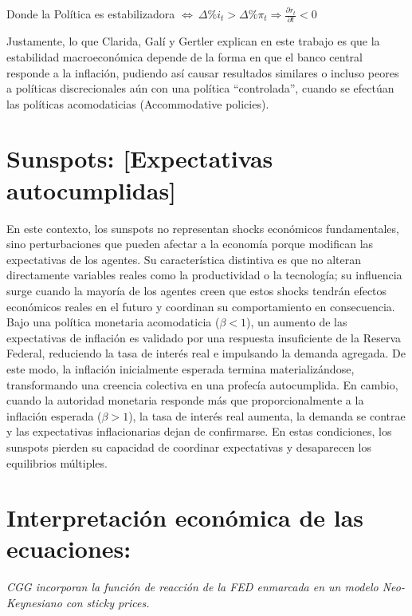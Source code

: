 \documentclass[12pt]{article}
\begin{document}
\vspace{1em}

Donde la Política es estabilizadora $\Leftrightarrow \ \Delta\% i_t>\Delta\%\pi_t \Rightarrow \frac{\partial r_t}{\partial t}<0$

\vspace{1em}

\indent Justamente, lo que Clarida, Galí y Gertler explican en este trabajo es que la estabilidad macroeconómica depende de la forma en que el banco central responde a la inflación, pudiendo así causar resultados similares o incluso peores a políticas discrecionales aún con una política “controlada”, cuando se efectúan las políticas acomodaticias (Accommodative policies).

\section{Sunspots: [Expectativas autocumplidas]}

\indent En este contexto, los sunspots no representan shocks económicos fundamentales, sino perturbaciones que pueden afectar a la economía porque modifican las expectativas de los agentes. Su característica distintiva es que no alteran directamente variables reales como la productividad o la tecnología; su influencia surge cuando la mayoría de los agentes creen que estos shocks tendrán efectos económicos reales en el futuro y coordinan su comportamiento en consecuencia. Bajo una política monetaria acomodaticia ($\beta<1$), un aumento de las expectativas de inflación es validado por una respuesta insuficiente de la Reserva Federal, reduciendo la tasa de interés real e impulsando la demanda agregada. De este modo, la inflación inicialmente esperada termina materializándose, transformando una creencia colectiva en una profecía autocumplida. En cambio, cuando la autoridad monetaria responde más que proporcionalmente a la inflación esperada ($\beta>1$), la tasa de interés real aumenta, la demanda se contrae y las expectativas inflacionarias dejan de confirmarse. En estas condiciones, los sunspots pierden su capacidad de coordinar expectativas y desaparecen los equilibrios múltiples.

\section{Interpretación económica de las ecuaciones:}

\textit{CGG incorporan la función de reacción de la FED enmarcada en un modelo Neo-Keynesiano con sticky prices.}
\end{document}
